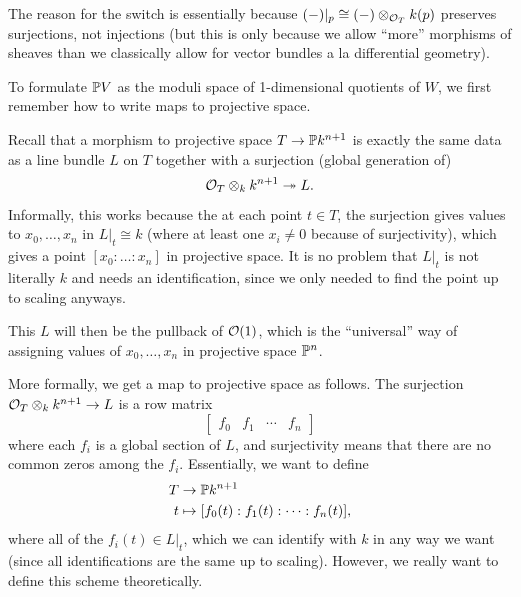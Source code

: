 \documentclass[12pt]{article}
\begin{document}
The reason for the switch is essentially because $(-)|_{p} \cong (-) \otimes_{\cO_T} k(p)$ preserves surjections, not injections (but this is only because we allow ``more'' morphisms of sheaves than we classically allow for vector bundles a la differential geometry).

To formulate $\P V$ as the moduli space of 1-dimensional quotients of $W$, we first remember how to write maps to projective space.

\begin{rmk}
    Recall that a morphism to projective space $T\to \P k^{n+1}$ is exactly the same data as a line bundle $L$ on $T$ together with a surjection (global generation of)
    \[\cO_T \otimes_k k^{n+1} \twoheadrightarrow L.\]
    Informally, this works because the at each point $t\in T$, the surjection gives values to $x_0,\dots,x_n$ in $L|_t\cong k$ (where at least one $x_i\neq 0$ because of surjectivity), which gives a point $[x_0:\dots:x_n]$ in projective space. It is no problem that $L|_t$ is not literally $k$ and needs an identification, since we only needed to find the point up to scaling anyways.

    This $L$ will then be the pullback of $\cO(1)$, which is the ``universal'' way of assigning values of $x_0,\dots,x_n$ in projective space $\P^n$.

    More formally, we get a map to projective space as follows. The surjection $\cO_T \otimes_k k^{n+1}\to L$ is a row matrix
    \[\begin{bmatrix}
        f_0 & f_1 & \cdots & f_n
    \end{bmatrix}\]
    where each $f_i$ is a global section of $L$, and surjectivity means that there are no common zeros among the $f_i$. Essentially, we want to define
    \begin{align*}
        T &\to \P k^{n+1}\\
        t &\mapsto [f_0(t): f_1(t): \cdots: f_n(t)],
    \end{align*}
    where all of the $f_i(t) \in L|_t$, which we can identify with $k$ in any way we want (since all identifications are the same up to scaling). However, we really want to define this scheme theoretically.
    

\end{rmk}
\end{document}
